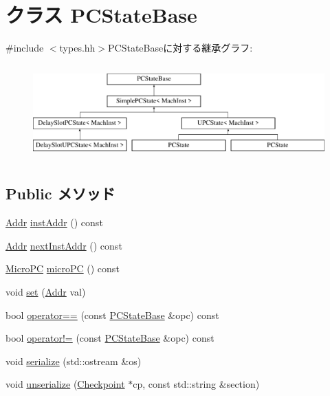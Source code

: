 \hypertarget{classGenericISA_1_1PCStateBase}{
\section{クラス PCStateBase}
\label{classGenericISA_1_1PCStateBase}
}


{\ttfamily \#include $<$types.hh$>$}PCStateBaseに対する継承グラフ:\begin{figure}[H]
\begin{center}
\leavevmode
\includegraphics[height=3.69637cm]{classGenericISA_1_1PCStateBase}
\end{center}
\end{figure}
\subsection*{Public メソッド}
\begin{DoxyCompactItemize}
\item 
\hyperlink{base_2types_8hh_af1bb03d6a4ee096394a6749f0a169232}{Addr} \hyperlink{classGenericISA_1_1PCStateBase_ae94f601fa23fcc26b8bbb57b896d10b5}{instAddr} () const 
\item 
\hyperlink{base_2types_8hh_af1bb03d6a4ee096394a6749f0a169232}{Addr} \hyperlink{classGenericISA_1_1PCStateBase_a3886aca2600d9d263e3aa4f94f76ce07}{nextInstAddr} () const 
\item 
\hyperlink{base_2types_8hh_adfb4d8b20c5abc8be73dd367b16f2d57}{MicroPC} \hyperlink{classGenericISA_1_1PCStateBase_a8f0ea0df7a63b5fbf898277c4d3a1268}{microPC} () const 
\item 
void \hyperlink{classGenericISA_1_1PCStateBase_a9a5b900e841dd75dc81970850547918f}{set} (\hyperlink{base_2types_8hh_af1bb03d6a4ee096394a6749f0a169232}{Addr} val)
\item 
bool \hyperlink{classGenericISA_1_1PCStateBase_a8643649fe59176cb0c5e8b48738c36fe}{operator==} (const \hyperlink{classGenericISA_1_1PCStateBase}{PCStateBase} \&opc) const 
\item 
bool \hyperlink{classGenericISA_1_1PCStateBase_af9600d6b82659d663fd0c8be2cbef409}{operator!=} (const \hyperlink{classGenericISA_1_1PCStateBase}{PCStateBase} \&opc) const 
\item 
void \hyperlink{classGenericISA_1_1PCStateBase_a53e036786d17361be4c7320d39c99b84}{serialize} (std::ostream \&os)
\item 
void \hyperlink{classGenericISA_1_1PCStateBase_af22e5d6d660b97db37003ac61ac4ee49}{unserialize} (\hyperlink{classCheckpoint}{Checkpoint} $\ast$cp, const std::string \&section)
\end{DoxyCompactItemize}
